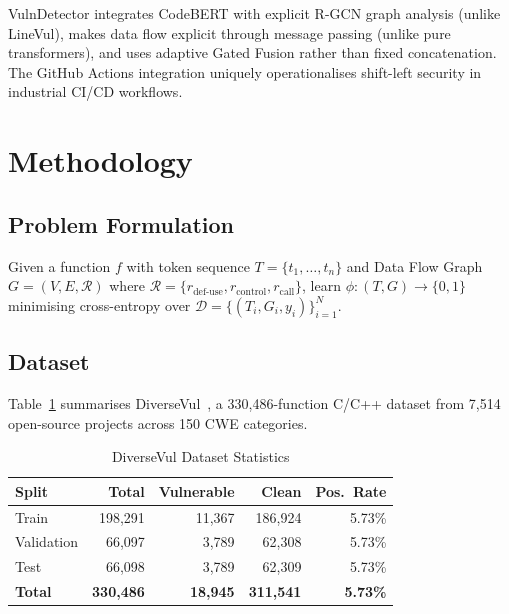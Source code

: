 \documentclass[12pt, letterpaper]{article}
\begin{document}
VulnDetector integrates CodeBERT with explicit R-GCN graph analysis (unlike
LineVul), makes data flow explicit through message passing (unlike pure
transformers), and uses adaptive Gated Fusion rather than fixed concatenation.
The GitHub Actions integration uniquely operationalises shift-left security in
industrial CI/CD workflows.

\section{Methodology}

\subsection{Problem Formulation}

Given a function $f$ with token sequence
$T=\{t_1,\ldots,t_n\}$ and Data Flow Graph
$G=(V,E,\mathcal{R})$ where
$\mathcal{R}=\{r_{\text{def-use}},r_{\text{control}},r_{\text{call}}\}$,
learn $\phi:(T,G)\to\{0,1\}$ minimising cross-entropy over
$\mathcal{D}=\{(T_i,G_i,y_i)\}_{i=1}^N$.

\subsection{Dataset}

Table~\ref{tab:dataset} summarises DiverseVul~\citep{chen2023}, a 330,486-function
C/C++ dataset from 7,514 open-source projects across 150 CWE categories.

\begin{table}[H]
\centering
\caption{DiverseVul Dataset Statistics}
\label{tab:dataset}
\begin{tabular}{lrrrr}
\toprule
\textbf{Split}&\textbf{Total}&\textbf{Vulnerable}&\textbf{Clean}&\textbf{Pos.\ Rate}\\
\midrule
Train      &198,291& 11,367&186,924&5.73\%\\
Validation & 66,097&  3,789& 62,308&5.73\%\\
Test       & 66,098&  3,789& 62,309&5.73\%\\
\midrule
\textbf{Total}&\textbf{330,486}&\textbf{18,945}&\textbf{311,541}&\textbf{5.73\%}\\
\bottomrule
\end{tabular}
\end{table}
\end{document}
